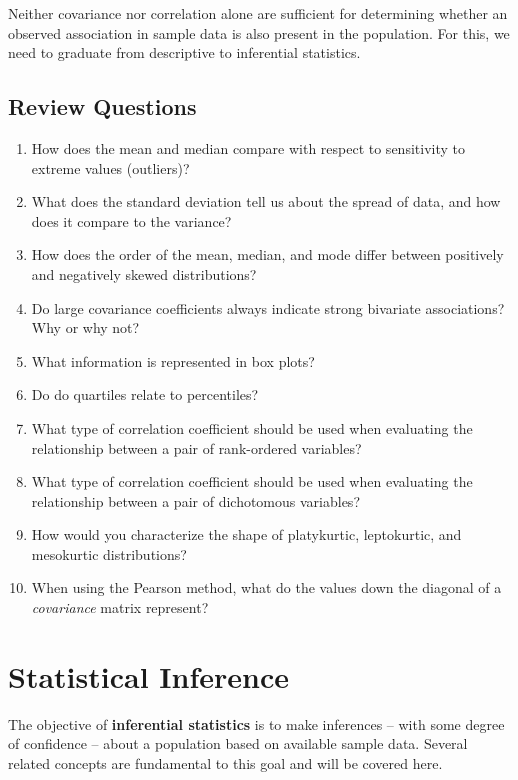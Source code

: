 \documentclass[
]{book}
\begin{document}
Neither covariance nor correlation alone are sufficient for determining whether an observed association in sample data is also present in the population. For this, we need to graduate from descriptive to inferential statistics.

\hypertarget{review-questions-5}{%
\section{Review Questions}\label{review-questions-5}}

\begin{enumerate}
\def\labelenumi{\arabic{enumi}.}
\item
  How does the mean and median compare with respect to sensitivity to extreme values (outliers)?
\item
  What does the standard deviation tell us about the spread of data, and how does it compare to the variance?
\item
  How does the order of the mean, median, and mode differ between positively and negatively skewed distributions?
\item
  Do large covariance coefficients always indicate strong bivariate associations? Why or why not?
\item
  What information is represented in box plots?
\item
  Do do quartiles relate to percentiles?
\item
  What type of correlation coefficient should be used when evaluating the relationship between a pair of rank-ordered variables?
\item
  What type of correlation coefficient should be used when evaluating the relationship between a pair of dichotomous variables?
\item
  How would you characterize the shape of platykurtic, leptokurtic, and mesokurtic distributions?
\item
  When using the Pearson method, what do the values down the diagonal of a \emph{covariance} matrix represent?
\end{enumerate}

\hypertarget{inf-stats}{%
\chapter{Statistical Inference}\label{inf-stats}}

The objective of \textbf{inferential statistics} is to make inferences -- with some degree of confidence -- about a population based on available sample data. Several related concepts are fundamental to this goal and will be covered here.
\end{document}
